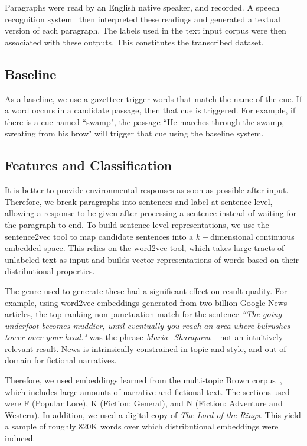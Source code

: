 \documentclass[10pt,a4paper]{article}
\begin{document}
Paragraphs were read by an English native speaker, and recorded.
A speech recognition system~\cite{lamere2003design} then interpreted these readings and generated a textual version of each paragraph.
The labels used in the text input corpus were then associated with these outputs.
This constitutes the transcribed dataset.

\subsection{Baseline}
As a baseline, we use a gazetteer trigger words that match the name of the cue.
If a word occurs in a candidate passage, then that cue is triggered.
For example, if there is a cue named ``swamp", the passage ``He marches through the swamp, sweating from his brow" will trigger that cue using the baseline system.

\subsection{Features and Classification}

It is better to provide environmental responses as soon as possible after input.
Therefore, we break paragraphs into sentences and label at sentence level, allowing a response to be given after processing a sentence instead of waiting for the paragraph to end.
To build sentence-level representations, we use the sentence2vec tool to map candidate sentences into a $k-$dimensional continuous embedded space.
This relies on the word2vec tool, which takes large tracts of unlabeled text as input and builds vector representations of words based on their distributional properties.

The genre used to generate these had a significant effect on result quality.
For example, using word2vec embeddings generated from two billion Google News articles, the top-ranking non-punctuation match for the sentence \emph{``The going underfoot becomes muddier, until eventually you reach an area where bulrushes tower over your head."} was the phrase {\em Maria\_Sharapova} -- not an intuitively relevant result.
News is intrinsically constrained in topic and style, and out-of-domain for fictional narratives.

Therefore, we used embeddings learned from the multi-topic Brown corpus~\cite{francis1979brown}, which includes large amounts of narrative and fictional text.
The sections used were F (Popular Lore), K (Fiction: General), and N (Fiction: Adventure and Western).
In addition, we used a digital copy of {\em The Lord of the Rings}.
This yield a sample of roughly 820K words over which distributional embeddings were induced.
\end{document}
